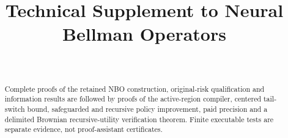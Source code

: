 \documentclass[ecta,nameyear,draft]{econsocart}
\begin{document}
\begin{frontmatter}
\title{Technical Supplement to Neural Bellman Operators}
\begin{aug}
\author[id=au1,addressref={add1}]{~}
\address[id=add1]{Peking University}
\end{aug}
\begin{abstract}Complete proofs of the retained NBO construction, original-risk qualification and information results are followed by proofs of the active-region compiler, centered tail-switch bound, safeguarded and recursive policy improvement, paid precision and a delimited Brownian recursive-utility verification theorem. Finite executable tests are separate evidence, not proof-assistant certificates.\end{abstract}
\end{frontmatter}












\end{document}
